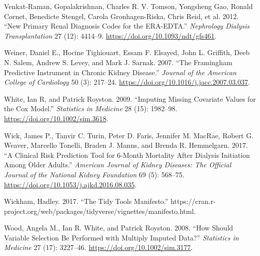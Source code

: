 \documentclass[
]{article}
\newlength{\cslhangindent}
\newenvironment{cslreferences}%
  {\setlength{\parindent}{0pt}%
  \everypar{\setlength{\hangindent}{\cslhangindent}}\ignorespaces}%
  {\par}
\begin{document}
\begin{cslreferences}
\leavevmode\hypertarget{ref-venkat-raman_new_2012}{}%
Venkat-Raman, Gopalakrishnan, Charles R. V. Tomson, Yongsheng Gao, Ronald Cornet, Benedicte Stengel, Carola Gronhagen-Riska, Chris Reid, et al. 2012. ``New Primary Renal Diagnosis Codes for the ERA-EDTA.'' \emph{Nephrology Dialysis Transplantation} 27 (12): 4414--9. \url{https://doi.org/10.1093/ndt/gfs461}.

\leavevmode\hypertarget{ref-weiner_framingham_2007}{}%
Weiner, Daniel E., Hocine Tighiouart, Essam F. Elsayed, John L. Griffith, Deeb N. Salem, Andrew S. Levey, and Mark J. Sarnak. 2007. ``The Framingham Predictive Instrument in Chronic Kidney Disease.'' \emph{Journal of the American College of Cardiology} 50 (3): 217--24. \url{https://doi.org/10.1016/j.jacc.2007.03.037}.

\leavevmode\hypertarget{ref-white_imputing_2009}{}%
White, Ian R, and Patrick Royston. 2009. ``Imputing Missing Covariate Values for the Cox Model.'' \emph{Statistics in Medicine} 28 (15): 1982--98. \url{https://doi.org/10.1002/sim.3618}.

\leavevmode\hypertarget{ref-wick_clinical_2017}{}%
Wick, James P., Tanvir C. Turin, Peter D. Faris, Jennifer M. MacRae, Robert G. Weaver, Marcello Tonelli, Braden J. Manns, and Brenda R. Hemmelgarn. 2017. ``A Clinical Risk Prediction Tool for 6-Month Mortality After Dialysis Initiation Among Older Adults.'' \emph{American Journal of Kidney Diseases: The Official Journal of the National Kidney Foundation} 69 (5): 568--75. \url{https://doi.org/10.1053/j.ajkd.2016.08.035}.

\leavevmode\hypertarget{ref-wickham_tidy_2017}{}%
Wickham, Hadley. 2017. ``The Tidy Tools Manifesto.'' https://cran.r-project.org/web/packages/tidyverse/vignettes/manifesto.html.

\leavevmode\hypertarget{ref-wood_how_2008}{}%
Wood, Angela M., Ian R. White, and Patrick Royston. 2008. ``How Should Variable Selection Be Performed with Multiply Imputed Data?'' \emph{Statistics in Medicine} 27 (17): 3227--46. \url{https://doi.org/10.1002/sim.3177}.
\end{cslreferences}
\end{document}
